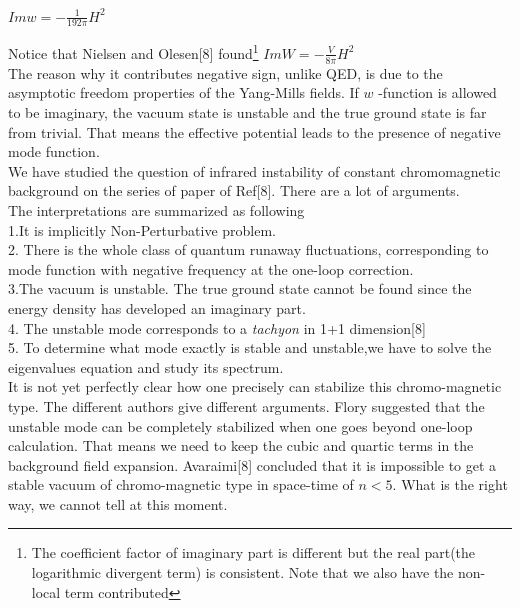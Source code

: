 \documentclass[a4paper,12 pt]{article}
\begin{document}
\begin{center}
$ Im w = - \frac{1}{192 \pi} H^{2}$
\end{center}
Notice that Nielsen and Olesen[8] found\footnote{The coefficient
factor of imaginary part is different but the real
 part(the logarithmic divergent term) is consistent.
  Note that we also have the non-local term contributed} $ Im W = - \frac{V
}{8\pi}H^{2} $\\
The reason why it contributes negative sign, unlike QED, is due to
the asymptotic freedom properties of the
 Yang-Mills fields.
 If $w$
-function is allowed to be imaginary, the vacuum state is unstable
and the true ground state is far from trivial. That means the
effective potential leads to the presence of negative mode
function.
\\We have studied the question of infrared instability of constant
chromomagnetic background on the series of paper of Ref[8]. There
are a lot of arguments.\\
The interpretations are summarized as following\\
1.It is implicitly Non-Perturbative problem. \\ 2. There is the
whole class of quantum runaway fluctuations, corresponding to mode
function with negative frequency at the
one-loop correction.\\
3.The vacuum is unstable. The true ground state cannot be found since the energy
density has developed an imaginary part.\\
4. The unstable mode corresponds to a \emph{tachyon} in 1+1 dimension[8]\\
5. To determine what mode exactly is stable and unstable,we have
to solve the eigenvalues equation and study its spectrum. \\
It is not yet perfectly clear how one precisely can stabilize this
chromo-magnetic type. The different authors give different
arguments. Flory suggested that the unstable mode can be
completely stabilized when one goes beyond one-loop calculation.
That means we need to keep the cubic and quartic terms in the
background field expansion. Avaraimi[8] concluded that it is
impossible to get a stable vacuum of chromo-magnetic type in
space-time of $n<5 $. What is the right way, we cannot tell at
this moment.
\end{document}
